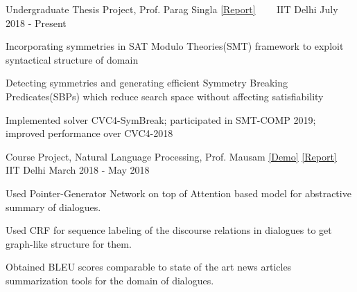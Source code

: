


\begin{cventries}

  
  \cventry
  {Undergraduate Thesis Project, Prof. Parag Singla \href{https://smt-comp.github.io/2019/system-descriptions/cvc4-symbreak.pdf}{[Report]}}
  {\href{https://docs.google.com/presentation/d/1TIlfgccQIz8VmogkZZMk7qBsq-PIYC3zyI5vv6IkX9w/edit?usp=sharing}{}
    \ \ \ \normalfont\href{https://docs.google.com/presentation/d/1TIlfgccQIz8VmogkZZMk7qBsq-PIYC3zyI5vv6IkX9w/edit?usp=sharing}
    {}}
  {IIT Delhi}
  {July 2018 - Present}
  {
    \begin{cvitems}
    \item Incorporating symmetries in SAT Modulo Theories(SMT)  framework to exploit syntactical structure of domain 
    \item Detecting symmetries and generating efficient Symmetry Breaking Predicates(SBPs) which reduce search space without affecting satisfiability  
    \item Implemented solver CVC4-SymBreak; participated in SMT-COMP 2019; improved performance over CVC4-2018
    \end{cvitems}
  }
  
  \cventry
  {Course Project, Natural Language Processing, Prof. Mausam \href{http://www.cse.iitd.ac.in/nlpdemo/abst_dial}{[Demo]}
  \href{http://www.cse.iitd.ac.in/nlpdemo/abst_dial/report.pdf}{[Report]}
  }
  {\href{https://github.com/saketdingliwal/Abstractive-Dialogue-Summarization}{}
    \ \ \ \normalfont\href{https://github.com/saketdingliwal/Abstractive-Dialogue-Summarization}
    {}}
  {IIT Delhi}
  {March 2018 - May 2018}
  {
    \begin{cvitems}
    \item Used Pointer-Generator Network on top of Attention based model for abstractive summary of dialogues.
    \item Used CRF for sequence labeling of the discourse relations in dialogues to get graph-like structure for them.
    \item Obtained BLEU scores comparable to state of the art news articles summarization tools for the domain of dialogues.
    \end{cvitems}
  }
  

\end{cventries}
